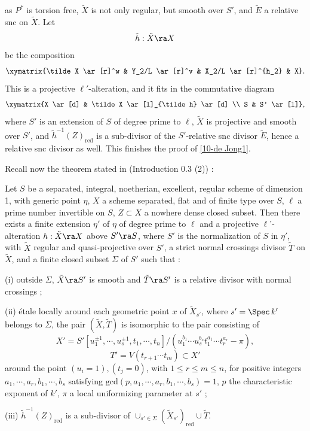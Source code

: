 \documentclass[10pt]{../fichiers-configuration-latex/smfart}
\begin{document}
as $P^*$ is torsion free, $\tilde X$ is not only regular, but smooth over $S'$,
and $\tilde E$ a relative snc on $\tilde X$. Let $$ \tilde h : \tilde X \ra X
$$ be the composition $$ \xymatrix{\tilde X \ar[r]^w & Y_2/L \ar[r]^v & X_2/L
\ar[r]^{h_2} & X}.  $$ This is a projective $\ell'$-alteration, and it fits
in the commutative diagram $$ \xymatrix{X \ar[d] & \tilde X \ar[l]_{\tilde
h} \ar[d] \\ S & S' \ar[l]}, $$ where $S'$ is an extension of $S$ of degree
prime to $\ell$, $\tilde X$ is projective and smooth over $S'$, and $\tilde
h^{-1}(Z)_{\mathrm{red}}$ is a sub-divisor of the $S'$-relative snc divisor
$\tilde E$, hence a relative snc divisor as well. This finishes the proof
of \ref{10-de Jong1}.

Recall now the theorem stated in (Introduction 0.3 (2)) :
\begin{theorem}[Gabber]\label{10-de Jong2} Let $S$ be a separated, integral,
noetherian, excellent, regular scheme of dimension 1, with generic point
$\eta$, $X$ a scheme separated, flat and of finite type over $S$, $\ell$
a prime number invertible on $S$, $Z \subset X$ a nowhere dense closed
subset. Then there exists a finite extension $\eta'$ of $\eta$ of degree prime
to $\ell$ and a projective $\ell$'-alteration $h : \tilde X \ra X$ above $S'
\ra S$, where $S'$ is the normalization of $S$ in $\eta'$, with $\tilde X$
regular and quasi-projective over $S'$, a strict normal crossings divisor
$\tilde T$ on $\tilde X$, and a finite closed subset $\Sigma$ of $S'$ such
that :

(i) outside $\Sigma$, $\tilde X \ra S'$ is smooth and $\tilde T \ra S'$
is a relative divisor with normal crossings ;

(ii) étale locally around each geometric point $x$ of $\tilde X_{s'}$,
where $s' = \Spec \, k'$ belongs to $\Sigma$, the pair $(\tilde X, \tilde T)$
is isomorphic to the pair consisting of
$$ X'=S'[u_1^{\pm 1}, \cdots, u_s^{\pm 1}, t_1, \cdots, t_n]/
(u_1^{b_1} \cdots u_s^{b_s}t_1^{a_1} \cdots t_r^{a_r}- \pi), $$
$$ T'=V(t_{r+1}\cdots t_m)\subset X'$$
around the point $(u_i = 1), (t_j = 0)$, with $1
\le r \le m \le n$, for positive integers $a_1, \cdots, a_r, b_1, \cdots, b_s$
satisfying $\mathrm{gcd}(p,a_1, \cdots, a_r, b_1, \cdots, b_s) = 1$, $p$ the
characteristic exponent of $k'$, $\pi$ a local uniformizing parameter at $s'$ ;

(iii) $\tilde h^{-1}(Z)_{\mathrm{red}}$ is a sub-divisor of $\cup_{s' \in
\Sigma}(\tilde X_{s'})_{\mathrm{red}} \cup \tilde T$.
\end{theorem}
\end{document}
